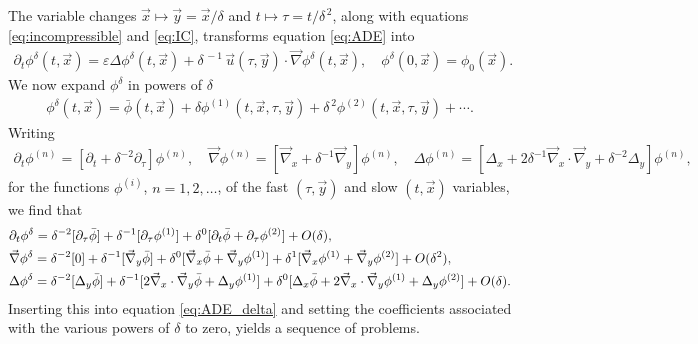 \documentclass[11pt]{amsart}
\begin{document}
The variable changes $\vec{x}\mapsto\vec{y}=\vec{x}/\delta$ and
$t\mapsto\tau=t/\delta^{\,2}$, along with equations \eqref{eq:incompressible} and
\eqref{eq:IC}, transforms equation \eqref{eq:ADE} into
\cite{McLaughlin:SIAM_JAM:780}    
%
\begin{align}\label{eq:ADE_delta}
  \partial_t\phi^\delta(t,\vec{x})=\varepsilon\Delta\phi^\delta(t,\vec{x})
                 +\delta^{\,-1}\,\vec{u}(\tau,\vec{y})\cdot\vec{\nabla}\phi^\delta(t,\vec{x}), \quad
      \phi^\delta(0,\vec{x})=\phi_0(\vec{x}).
\end{align}
%
We now expand $\phi^\delta$ in powers of $\delta$ \cite{McLaughlin:SIAM_JAM:780} 
%
\begin{align}\label{eq:Expand}
  \phi^\delta(t,\vec{x})=\bar{\phi}(t,\vec{x})
                 +\delta\phi^{(1)}(t,\vec{x},\tau,\vec{y})
                 +\delta^{\,2}\phi^{(2)}(t,\vec{x},\tau,\vec{y})+\cdots.
\end{align}
%
Writing
%
\begin{align*}
  \partial_t\phi^{(n)}=[\partial_t+\delta^{-2}\partial_\tau]\phi^{(n)}, \quad
  \vec{\nabla}\phi^{(n)}=[\vec{\nabla}_x+\delta^{-1}\vec{\nabla}_y]\phi^{(n)}, \quad
  \Delta\phi^{(n)}=[\Delta_x+2\delta^{-1}\vec{\nabla}_x\cdot\vec{\nabla}_y+\delta^{-2}\Delta_y]\phi^{(n)},
\end{align*}
%
for the functions $\phi^{(i)}$, $n=1,2,\ldots$, of the fast $(\tau,\vec{y})$ and
slow $(t,\vec{x})$ variables, we find that
%
\begin{align}
  &\partial_t\phi^\delta=\delta^{-2}[\partial_\tau\bar{\phi}]
      +\delta^{-1}[\partial_\tau\phi^{(1)}]
      +\delta^0[\partial_t\bar{\phi}+\partial_\tau\phi^{(2)}]+O(\delta),
      \\
  &\vec{\nabla}\phi^\delta=\delta^{-2}[0]
            +\delta^{-1}[\vec{\nabla}_y\bar{\phi}]
            +\delta^0[\vec{\nabla}_x\bar{\phi}+\vec{\nabla}_y\phi^{(1)}]
            +\delta^1[\vec{\nabla}_x\phi^{(1)}+\vec{\nabla}_y\phi^{(2)}]+O(\delta^2),
            \notag\\
  &\Delta\phi^\delta=\delta^{-2}[\Delta_y\bar{\phi}]
      +\delta^{-1}[2\vec{\nabla}_x\cdot\vec{\nabla}_y\bar{\phi}+\Delta_y\phi^{(1)}]
      +\delta^0[\Delta_x\bar{\phi}+2\vec{\nabla}_x\cdot\vec{\nabla}_y\phi^{(1)}+\Delta_y\phi^{(2)}]+O(\delta).
      \notag
\end{align}
%
Inserting this into equation \eqref{eq:ADE_delta} and setting the
coefficients associated with the various powers of $\delta$ to zero,
yields a sequence of problems.
\end{document}
